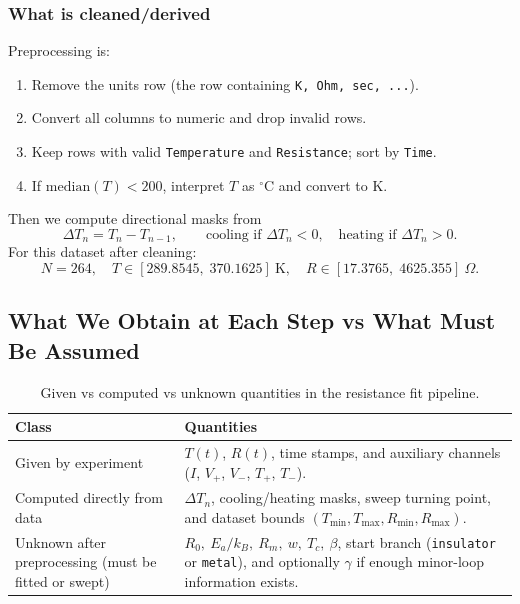 \documentclass[11pt]{article}
\begin{document}
\subsubsection*{What is cleaned/derived}
Preprocessing is:
\begin{enumerate}
    \item Remove the units row (the row containing \texttt{K, Ohm, sec, ...}).
    \item Convert all columns to numeric and drop invalid rows.
    \item Keep rows with valid \texttt{Temperature} and \texttt{Resistance}; sort by \texttt{Time}.
    \item If \(\mathrm{median}(T)<200\), interpret \(T\) as \(^\circ\mathrm{C}\) and convert to K.
\end{enumerate}
Then we compute directional masks from
\begin{equation}
\Delta T_n = T_n - T_{n-1},
\qquad
\text{cooling if }\Delta T_n<0,\quad
\text{heating if }\Delta T_n>0.
\label{eq:fit_dt_sign}
\end{equation}
For this dataset after cleaning:
\[
N=264,\quad
T\in[289.8545,\;370.1625]\ \mathrm{K},\quad
R\in[17.3765,\;4625.355]\ \Omega.
\]

\subsection{What We Obtain at Each Step vs What Must Be Assumed}
\begin{table}[htbp]
\centering
\small
\caption{Given vs computed vs unknown quantities in the resistance fit pipeline.}
\label{tab:fit_known_unknown}
\begin{tabular}{p{}p{}}
\toprule
Class & Quantities \\
\midrule
Given by experiment &
\(T(t)\), \(R(t)\), time stamps, and auxiliary channels (\(I\), \(V_+\), \(V_-\), \(T_+\), \(T_-\)). \\
Computed directly from data &
\(\Delta T_n\), cooling/heating masks, sweep turning point, and dataset bounds \((T_{\min},T_{\max},R_{\min},R_{\max})\). \\
Unknown after preprocessing (must be fitted or swept) &
\(R_0,\ E_a/k_B,\ R_m,\ w,\ T_c,\ \beta\), start branch (\texttt{insulator} or \texttt{metal}), and optionally \(\gamma\) if enough minor-loop information exists. \\
\bottomrule
\end{tabular}
\end{table}
\end{document}
